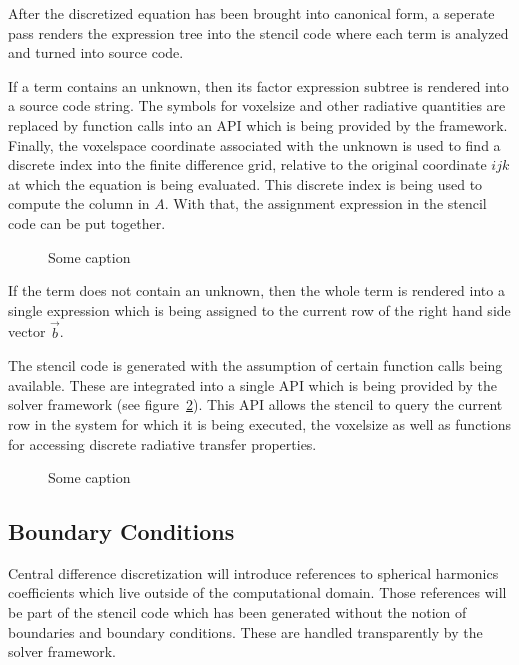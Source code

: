 After the discretized equation has been brought into canonical form, a seperate pass renders the expression tree into the stencil code where each term is analyzed and turned into source code.

If a term contains an unknown, then its factor expression subtree is rendered into a source code string. The symbols for voxelsize and other radiative quantities are replaced by function calls into an API which is being provided by the framework. Finally, the voxelspace coordinate associated with the unknown is used to find a discrete index into the finite difference grid, relative to the original coordinate $ijk$ at which the equation is being evaluated. This discrete index is being used to compute the column in $A$. With that, the assignment expression in the stencil code can be put together.
\begin{figure}[h]
\centering
{}
\caption{Some caption}
\label{fig:pn_discretization_codegen}
\end{figure}

If the term does not contain an unknown, then the whole term is rendered into a single expression which is being assigned to the current row of the right hand side vector $\vec{b}$.

The stencil code is generated with the assumption of certain function calls being available. These are integrated into a single API which is being provided by the solver framework (see figure~\ref{fig:pn_discretization_codegen_stencilAPI}). This API allows the stencil to query the current row in the system for which it is being executed, the voxelsize as well as functions for accessing discrete radiative transfer properties.
\begin{figure}[h]
\centering
{}
\caption{Some caption}
\label{fig:pn_discretization_codegen_stencilAPI}
\end{figure}


\subsection{Boundary Conditions}
\label{sec:pn_bc}

Central difference discretization will introduce references to spherical harmonics coefficients which live outside of the computational domain. Those references will be part of the stencil code which has been generated without the notion of boundaries and boundary conditions. These are handled transparently by the solver framework.

